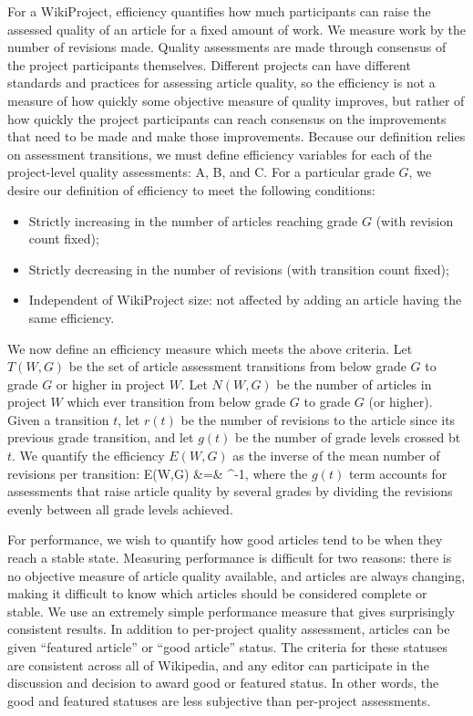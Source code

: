 For a WikiProject, efficiency quantifies how much participants can raise the
assessed quality of an article for a fixed amount of work.
We measure work by the number of revisions made.
Quality assessments are made through consensus of the project participants themselves.
Different projects can have different standards and practices for assessing article quality,
so the efficiency is not a measure of how quickly some objective measure of quality improves,
but rather of how quickly the project participants can reach consensus on the improvements that
need to be made and make those improvements.
Because our definition relies on assessment transitions,
we must define efficiency variables for
each of the project-level quality assessments: A, B, and C.
For a particular grade $G$,
we desire our definition of efficiency to meet the following conditions:
\begin{itemize}
\item{Strictly increasing in the number of articles reaching grade $G$ (with revision count fixed);}
\item{Strictly decreasing in the number of revisions (with transition count fixed);}
\item{Independent of WikiProject size: not affected by adding an article having the same efficiency.}
\end{itemize}

We now define an efficiency measure which meets the above criteria.
Let $T(W,G)$ be the set of article assessment transitions from below grade $G$
to grade $G$ or higher in project $W$.
Let $N(W,G)$ be the number of articles in project $W$ which ever transition
from below grade $G$ to grade $G$ (or higher).
Given a transition $t$,
let $r(t)$ be the number of revisions to the article
since its previous grade transition,
and let $g(t)$ be the number of grade levels crossed bt $t$.
We quantify the efficiency $E(W,G)$ as the inverse of the mean number of revisions
per transition:
\beq
E(W,G)
&=&
^{-1},
\eeq
where the $g(t)$ term accounts for assessments that raise article quality by
several grades by
dividing the revisions evenly between all grade levels achieved.

For performance, we wish to quantify how good articles tend to be when they reach a stable state.
Measuring performance is difficult for two reasons:
there is no objective measure of article quality available,
and articles are always changing, making it difficult to know which articles should be considered
complete or stable.
We use an extremely simple performance measure that gives surprisingly consistent results.
In addition to per-project quality assessment, articles can be given ``featured article'' or
``good article'' status.
The criteria for these statuses are consistent across all of Wikipedia,
and any editor can participate in the discussion and decision to award good or featured
status.
In other words, the good and featured statuses are less subjective than per-project assessments.

